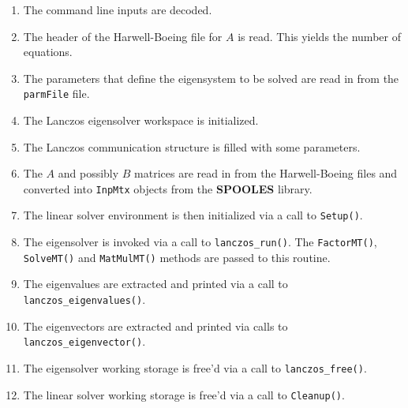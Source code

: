 \begin{enumerate}
\item
The command line inputs are decoded.
\item
The header of the Harwell-Boeing file for $A$ is read.
This yields the number of equations.
\item
The parameters that define the eigensystem to be solved
are read in from the {\tt parmFile} file.
\item
The Lanczos eigensolver workspace is initialized.
\item
The Lanczos communication structure is filled with some parameters.
\item
The $A$ and possibly $B$ matrices are read in from the
Harwell-Boeing files and converted into {\tt InpMtx} objects
from the {\bf SPOOLES} library.
\item
The linear solver environment is then initialized via a call to 
{\tt Setup()}.
\item
The eigensolver is invoked via a call to {\tt lanczos\_run()}.
The {\tt FactorMT()}, {\tt SolveMT()} and {\tt MatMulMT()}
methods are passed to this routine.
\item
The eigenvalues are extracted and printed via a call to
{\tt lanczos\_eigenvalues()}.
\item
The eigenvectors are extracted and printed via calls to
{\tt lanczos\_eigenvector()}.
\item
The eigensolver working storage is free'd via a call to
{\tt lanczos\_free()}.
\item
The linear solver working storage is free'd via a call to
{\tt Cleanup()}.
\end{enumerate}
